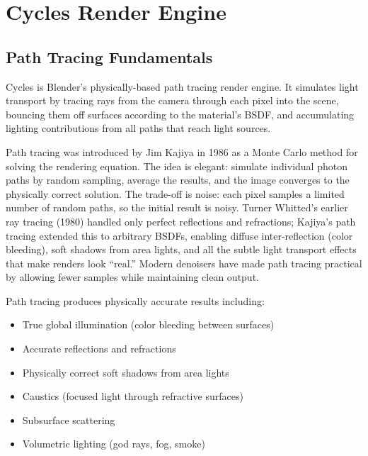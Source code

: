 \section{Cycles Render Engine}
\label{sec:shading:cycles}

\subsection{Path Tracing Fundamentals}

Cycles is Blender's physically-based path tracing render engine. It
simulates light transport by tracing rays from the camera through
each pixel into the scene, bouncing them off surfaces according to
the material's BSDF, and accumulating lighting contributions from
all paths that reach light sources.

\begin{historynote}
Path tracing was introduced by Jim Kajiya in 1986 as a Monte Carlo
method for solving the rendering equation. The idea is elegant:
simulate individual photon paths by random sampling, average the
results, and the image converges to the physically correct solution.
The trade-off is noise: each pixel samples a limited number of
random paths, so the initial result is noisy. Turner Whitted's
earlier ray tracing (1980) handled only perfect reflections and
refractions; Kajiya's path tracing extended this to arbitrary BSDFs,
enabling diffuse inter-reflection (color bleeding), soft shadows
from area lights, and all the subtle light transport effects that
make renders look ``real.'' Modern denoisers have made path tracing
practical by allowing fewer samples while maintaining clean output.
\end{historynote}

Path tracing produces physically accurate results including:
\begin{itemize}[leftmargin=2em]
  \item True global illumination (color bleeding between surfaces)
  \item Accurate reflections and refractions
  \item Physically correct soft shadows from area lights
  \item Caustics (focused light through refractive surfaces)
  \item Subsurface scattering
  \item Volumetric lighting (god rays, fog, smoke)
\end{itemize}

